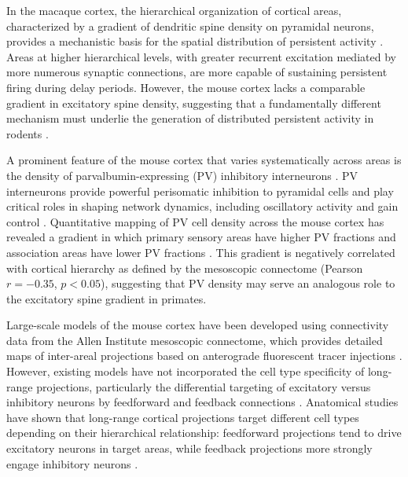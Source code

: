 \documentclass[11pt]{article}
\begin{document}
In the macaque cortex, the hierarchical organization of cortical areas, characterized by a gradient of dendritic spine density on pyramidal neurons, provides a mechanistic basis for the spatial distribution of persistent activity \citep{wang2020,murray2014}. Areas at higher hierarchical levels, with greater recurrent excitation mediated by more numerous synaptic connections, are more capable of sustaining persistent firing during delay periods. However, the mouse cortex lacks a comparable gradient in excitatory spine density, suggesting that a fundamentally different mechanism must underlie the generation of distributed persistent activity in rodents \citep{hart2022}.

A prominent feature of the mouse cortex that varies systematically across areas is the density of parvalbumin-expressing (PV) inhibitory interneurons \citep{kim2017}. PV interneurons provide powerful perisomatic inhibition to pyramidal cells and play critical roles in shaping network dynamics, including oscillatory activity and gain control \citep{hu2014,atallah2012}. Quantitative mapping of PV cell density across the mouse cortex has revealed a gradient in which primary sensory areas have higher PV fractions and association areas have lower PV fractions \citep{kim2017}. This gradient is negatively correlated with cortical hierarchy as defined by the mesoscopic connectome (Pearson $r = -0.35$, $p < 0.05$), suggesting that PV density may serve an analogous role to the excitatory spine gradient in primates.

Large-scale models of the mouse cortex have been developed using connectivity data from the Allen Institute mesoscopic connectome, which provides detailed maps of inter-areal projections based on anterograde fluorescent tracer injections \citep{oh2014,knox2019}. However, existing models have not incorporated the cell type specificity of long-range projections, particularly the differential targeting of excitatory versus inhibitory neurons by feedforward and feedback connections \citep{harris2019}. Anatomical studies have shown that long-range cortical projections target different cell types depending on their hierarchical relationship: feedforward projections tend to drive excitatory neurons in target areas, while feedback projections more strongly engage inhibitory neurons \citep{markov2014,defelipe2002}.
\end{document}
